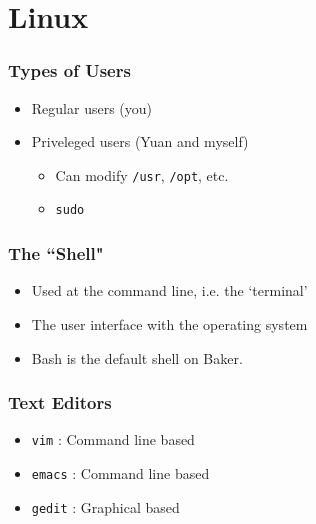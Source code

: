 \documentclass{beamer}
\newcommand{\code}[1]{\colorbox{codegray}{\texttt{#1}}}
\begin{document}
 
\section{Linux}

\begin{frame}
\frametitle{Types of Users}
\begin{itemize}
    \item Regular users (you)
    \bigskip

    \item Priveleged users (Yuan and myself)
    \bigskip

    \begin{itemize}
        \item Can modify \code{/usr}, \code{/opt}, etc.
        \bigskip

        \item \code{sudo}
    \end{itemize}
\end{itemize}
\end{frame}


\begin{frame}
\frametitle{The ``Shell"}
    \begin{itemize}
        \item Used at the command line, i.e. the `terminal'
        \pause
        \bigskip
        \item The user interface with the operating system
        \pause
        \bigskip
        \item Bash is the default shell on Baker.
    \end{itemize}
\end{frame}


\begin{frame}
\frametitle{Text Editors}
\begin{itemize}
    \item \code{vim}   : Command line based
    \pause
    \bigskip
    \item \code{emacs} : Command line based
    \pause
    \bigskip
    \item \code{gedit} : Graphical  based
\end{itemize}
\end{frame}
\end{document}
